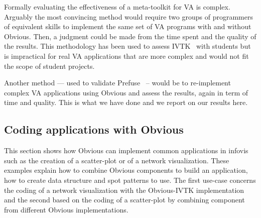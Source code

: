 
Formally evaluating the effectiveness of a meta-toolkit for VA is
complex. Arguably the most convincing method would require two groups
of programmers of equivalent skills to implement the same set of
VA programs with and without Obvious. Then, a judgment
could be made from the time spent and the quality of the results. This
methodology has been used to assess IVTK~\cite{InfoVis} with students
but is impractical for real VA applications that are
more complex and would not fit the scope of student projects.

Another method --- used to validate Prefuse~\cite{Prefuse} -- would be
to re-implement complex VA applications using Obvious
and assess the results, again in term of time and quality. This is
what we have done and we report on our results here.

\subsection{Coding applications with Obvious}

This section shows how Obvious can implement common applications in
infovis such as the creation of a scatter-plot or of
a network visualization.  These examples explain how to combine
Obvious components to build an application, how to create data
structure and spot patterns to use.  The first use-case concerns the
coding of a network visualization with the Obvious-IVTK
implementation and the second based on the coding of a scatter-plot by
combining component from different Obvious implementations.

